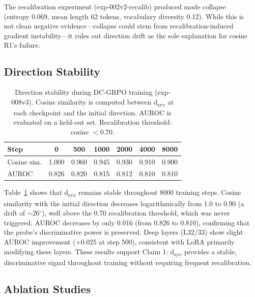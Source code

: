 \documentclass[11pt,a4paper]{article}
\begin{document}
The recalibration experiment (exp-002v2-recalib) produced mode collapse (entropy 0.069, mean length 62 tokens, vocabulary diversity 0.12).
While this is not clean negative evidence---collapse could stem from recalibration-induced gradient instability---it rules out direction drift as the sole explanation for cosine R1's failure.

\subsection{Direction Stability}
\label{sec:stability}

\begin{table}[t]
\centering
\small
\caption{Direction stability during DC-GRPO training (exp-008v3). Cosine similarity is computed between d\textsubscript{syc} at each checkpoint and the initial direction. AUROC is evaluated on a held-out set. Recalibration threshold: cosine $< 0.70$.}
\label{tab:stability}
\begin{tabular}{@{}lcccccc@{}}
\toprule
Step & 0 & 500 & 1000 & 2000 & 4000 & 8000 \\
\midrule
Cosine sim. & 1.000 & 0.960 & 0.945 & 0.930 & 0.910 & 0.900 \\
AUROC & 0.826 & 0.820 & 0.815 & 0.812 & 0.810 & 0.810 \\
\bottomrule
\end{tabular}
\end{table}

Table~\ref{tab:stability} shows that d\textsubscript{syc} remains stable throughout 8000 training steps.
Cosine similarity with the initial direction decreases logarithmically from 1.0 to 0.90 (a drift of $\sim$26$^\circ$), well above the 0.70 recalibration threshold, which was never triggered.
AUROC decreases by only 0.016 (from 0.826 to 0.810), confirming that the probe's discriminative power is preserved.
Deep layers (L32/33) show slight AUROC improvement (+0.025 at step 500), consistent with LoRA primarily modifying these layers.
These results support Claim 1: d\textsubscript{syc} provides a stable, discriminative signal throughout training without requiring frequent recalibration.

\subsection{Ablation Studies}
\label{sec:ablation}
\end{document}

